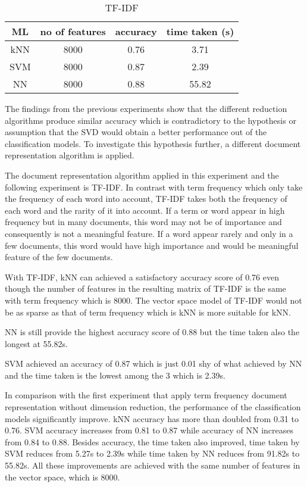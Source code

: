 \begin{table} [ht]
	\centering
	\begin{tabular}{|| c | c | c | c||}
		\hline
		ML & no of features & accuracy & time taken (s) \\ [0.5ex]
		\hline\hline
		kNN & 8000 & 0.76 & 3.71 \\ 
		\hline
		SVM & 8000 & 0.87 & 2.39 \\
		\hline
		NN & 8000 & 0.88 & 55.82 \\
		\hline
	\end{tabular}
\caption{TF-IDF}
\label{tbl:tfidf}
\end{table}

The findings from the previous experiments show that the different reduction algorithms produce similar accuracy which is contradictory to the hypothesis or assumption that the SVD would obtain a better performance out of the classification models. To investigate this hypothesis further, a different document representation algorithm is applied.
 
The document representation algorithm applied in this experiment and the following experiment is TF-IDF. In contrast with term frequency which only take the frequency of each word into account, TF-IDF takes both the frequency of each word and the rarity of it into account. If a term or word appear in high frequency but in many documents, this word may not be of importance and consequently is not a meaningful feature. If a word appear rarely and only in a few documents, this word would have high importance and would be meaningful feature of the few documents.

With TF-IDF, kNN can achieved a satisfactory accuracy score of 0.76 even though the number of features in the resulting matrix of TF-IDF is the same with term frequency which is 8000. The vector space model of TF-IDF would not be as sparse as that of term frequency which is kNN is more suitable for kNN.

NN is still provide the highest accuracy score of 0.88 but the time taken also the longest at 55.82s.

SVM achieved an accuracy of 0.87 which is just 0.01 shy of what achieved by NN and the time taken is the lowest among the 3 which is 2.39s.

In comparison with the first experiment that apply term frequency document representation without dimension reduction, the performance of the classification models significantly improve. kNN accuracy has more than doubled from 0.31 to 0.76. SVM accuracy increases from 0.81 to 0.87 while accuracy of NN increases from  0.84 to 0.88. Besides accuracy, the time taken also improved, time taken by SVM reduces from 5.27s to 2.39s while time taken by NN reduces from 91.82s to 55.82s. All these improvements are achieved with the same number of features in the vector space, which is 8000. 

